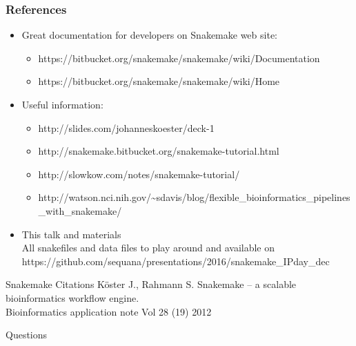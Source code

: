 \documentclass{beamer}
\begin{document}
\begin{frame}
    \frametitle{References}
    \begin{itemize}
        \item Great documentation for developers on Snakemake web site:
        \begin{itemize}
	    \item {\tiny https://bitbucket.org/snakemake/snakemake/wiki/Documentation}
            \item {\tiny https://bitbucket.org/snakemake/snakemake/wiki/Home}
        \end{itemize}        
        \item Useful information:
        \begin{itemize}
            \item {\tiny http://slides.com/johanneskoester/deck-1}
            \item {\tiny http://snakemake.bitbucket.org/snakemake-tutorial.html}
            \item {\tiny http://slowkow.com/notes/snakemake-tutorial/}
            \item {\tiny http://watson.nci.nih.gov/{\textasciitilde{}}sdavis/blog/flexible\_bioinformatics\_pipelines\_with\_snakemake/}
        \end{itemize}
        \item This talk and materials
        \\
        {\normalsize All snakefiles and data files to play 
	  around and available on
        {\tiny https://github.com/sequana/presentations/2016/snakemake\_IPday\_dec}       
        }
    \end{itemize}
    
    \begin{block}{Snakemake Citations}
    {\tiny 
    K\"oster J., Rahmann S. 
    Snakemake -- a scalable bioinformatics workflow engine.    \\
    Bioinformatics application note  Vol 28 (19) 2012 }
    \end{block}
  
        
\end{frame}




\begin{frame}[plain]
 \centering
 \begin{Huge}
  Questions 
 \end{Huge}
\end{frame}
\end{document}
